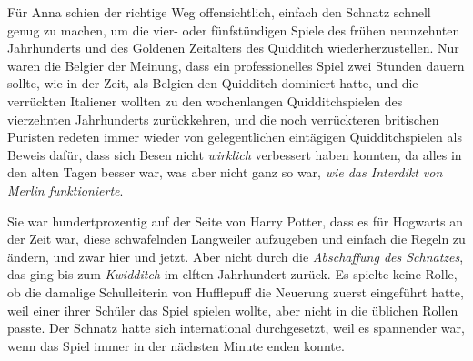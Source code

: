 Für Anna schien der richtige Weg offensichtlich, einfach den Schnatz schnell genug zu machen, um die vier- oder fünfstündigen Spiele des frühen neunzehnten Jahrhunderts und des Goldenen Zeitalters des Quidditch wiederherzustellen. Nur waren die Belgier der Meinung, dass ein professionelles Spiel zwei Stunden dauern sollte, wie in der Zeit, als Belgien den Quidditch dominiert hatte, und die verrückten Italiener wollten zu den wochenlangen Quidditchspielen des vierzehnten Jahrhunderts zurückkehren, und die noch verrückteren britischen Puristen redeten immer wieder von gelegentlichen eintägigen Quidditchspielen als Beweis dafür, dass sich Besen nicht \emph{wirklich} verbessert haben konnten, da alles in den alten Tagen besser war, was aber nicht ganz so war, \emph{wie das Interdikt von Merlin funktionierte}.

Sie war hundertprozentig auf der Seite von Harry Potter, dass es für Hogwarts an der Zeit war, diese schwafelnden Langweiler aufzugeben und einfach die Regeln zu ändern, und zwar hier und jetzt. Aber nicht durch die \emph{Abschaffung des Schnatzes}, das ging bis zum \emph{Kwidditch} im elften Jahrhundert zurück. Es spielte keine Rolle, ob die damalige Schulleiterin von Hufflepuff die Neuerung zuerst eingeführt hatte, weil einer ihrer Schüler das Spiel spielen wollte, aber nicht in die üblichen Rollen passte. Der Schnatz hatte sich international durchgesetzt, weil es spannender war, wenn das Spiel immer in der nächsten Minute enden konnte.

